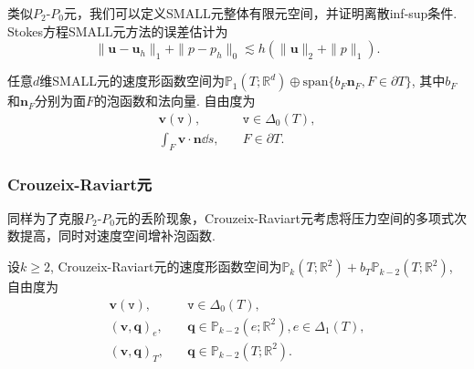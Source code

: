 类似$P_2$-$P_0$元，我们可以定义SMALL元整体有限元空间，并证明离散inf-sup条件. Stokes方程SMALL元方法的误差估计为
\begin{equation*}
\|\boldsymbol{u}-\boldsymbol{u}_h\|_{1} + \|p-p_h\|_{0}
\lesssim h(\|\boldsymbol{u}\|_2+\|p\|_1).
\end{equation*}


任意$d$维SMALL元的速度形函数空间为$\mathbb P_1(T;\mathbb R^d)\oplus\mathrm{span}\{b_F\boldsymbol{n}_F, F\in\partial T\}$, 其中$b_F$和$\boldsymbol{n}_F$分别为面$F$的泡函数和法向量. %
自由度为
\begin{align*}
\boldsymbol{v}(\texttt{v}), &\quad \texttt{v}\in\Delta_0(T), \\
\int_{F}\boldsymbol{v}\cdot\boldsymbol{n}\dd s, &\quad F\in\partial T.
\end{align*}


\subsubsection{Crouzeix-Raviart元}

同样为了克服$P_2$-$P_0$元的丢阶现象，Crouzeix-Raviart元\cite{CrouzeixRaviart1973}考虑将压力空间的多项式次数提高，同时对速度空间增补泡函数.

设$k\geq2$, Crouzeix-Raviart元的速度形函数空间为$\mathbb P_k(T;\mathbb R^2)+b_T\mathbb P_{k-2}(T;\mathbb R^2)$, 自由度为
\begin{subequations}\label{CrouzeixRaviart2dDoF}
\begin{align}
\label{CrouzeixRaviart2dDoF1}
\boldsymbol{v}(\texttt{v}), &\quad \texttt{v}\in\Delta_0(T), \\
\label{CrouzeixRaviart2dDoF2}
(\boldsymbol{v}, \boldsymbol{q})_e, &\quad \boldsymbol{q}\in\mathbb P_{k-2}(e;\mathbb R^2), e\in\Delta_1(T), \\
\label{CrouzeixRaviart2dDoF3}
(\boldsymbol{v}, \boldsymbol{q})_T, &\quad \boldsymbol{q}\in\mathbb P_{k-2}(T;\mathbb R^2).
\end{align}
\end{subequations}

